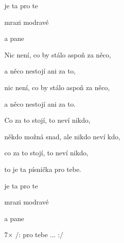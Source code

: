 

\zs
{} je ta  pro te

 

mrazi  modravé  

 a pane
\ks

\zs
Nic není, co by stálo aspoň za něco,

a něco nestojí ani za to,

nic není, co by stálo aspoň za něco,

a něco nestojí ani za to.
\ks

\zs
Co za to stojí, to neví nikdo,

někdo možná snad, ale nikdo neví kdo,

co za to stojí, to neví nikdo,

to je ta písnička pro tebe.
\ks

\zs
{} je ta  pro te

 

mrazi  modravé  

 a pane
\ks

7× /: pro tebe ... :/

\kp






















